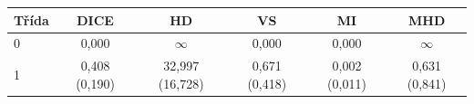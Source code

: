 \begin{tabular}{l c c c c c}
 \hline
Třída & DICE & HD & VS & MI & MHD \\ \hline
0 & 0,000 & $\infty$ & 0,000 & 0,000 & $\infty$ \\
1 & 0,408 (0,190) & 32,997 (16,728) & 0,671 (0,418) & 0,002 (0,011) & 0,631 (0,841) \\
\hline 
 \end{tabular}
